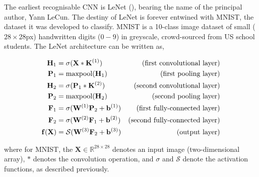 The earliest recognisable CNN is LeNet (\cite{lecun1998gradient}), bearing the name of the principal author, Yann LeCun. The destiny of LeNet is forever entwined with MNIST, the dataset it was developed to classify. MNIST is a 10-class image dataset of small ($28\times28$px) handwritten digits ($0-9$) in greyscale, crowd-sourced from US school students. The LeNet architecture can be written as,

\begin{align}
\mathbf{H}_1 &= \sigma(\mathbf{X} * \mathbf{K}^{(1)}) & \text{(first convolutional layer)}\notag \\
\mathbf{P}_1 &= \text{maxpool}(\mathbf{H}_1) & \text{(first pooling layer)}\notag \\
\mathbf{H}_2 &= \sigma(\mathbf{P}_1 * \mathbf{K}^{(2)}) & \text{(second convolutional layer)} \notag \\
\mathbf{P}_2 &= \text{maxpool}(\mathbf{H}_2) & \text{(second pooling layer)} \notag \\
\mathbf{F}_1 &= \sigma(\mathbf{W}^{(1)}\mathbf{P}_2 + \mathbf{b}^{(1)}) & \text{(first fully-connected layer)} \notag \\
\mathbf{F}_2 &= \sigma(\mathbf{W}^{(2)}\mathbf{F}_1 + \mathbf{b}^{(2)}) & \text{(second fully-connected layer)} \notag \\
\mathbf{f}(\mathbf{X}) &= \mathcal{S}(\mathbf{W}^{(3)}\mathbf{F}_2 + \mathbf{b}^{(3)}) & \text{(output layer)}
\end{align}

where for MNIST, the $\mathbf{X} \in \mathbb{R}^{28\times28}$ denotes an input image (two-dimensional array), $*$ denotes the convolution operation, and $\sigma$ and $\mathcal{S}$ denote the activation functions, as described previously. 

